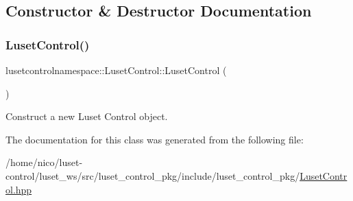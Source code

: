 \subsection{Constructor \& Destructor Documentation}
\mbox{\label{classlusetcontrolnamespace_1_1LusetControl_ac7ff810736d5e163bbb0a6fb476d0009}} 
\subsubsection{\texorpdfstring{Luset\+Control()}{LusetControl()}}
{\footnotesize\ttfamily lusetcontrolnamespace\+::\+Luset\+Control\+::\+Luset\+Control (\begin{DoxyParamCaption}{ }\end{DoxyParamCaption})}



Construct a new Luset Control object. 



The documentation for this class was generated from the following file\+:\begin{DoxyCompactItemize}
\item 
/home/nico/luset-\/control/luset\+\_\+ws/src/luset\+\_\+control\+\_\+pkg/include/luset\+\_\+control\+\_\+pkg/\hyperlink{LusetControl_8hpp}{Luset\+Control.\+hpp}\end{DoxyCompactItemize}
